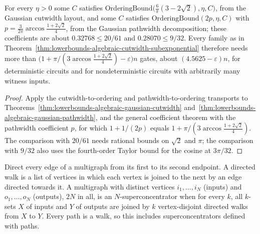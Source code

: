 \begin{theorem}
  \label{thm:lowerbounds-algebraic-gaussian-coefficient}
  \leanok
  For every $\eta>0$ some $C$ satisfies
  $\mathrm{OrderingBound}\bigl(\tfrac{6}{\pi}(3-2\sqrt2),\eta,C\bigr)$, from the
  Gaussian cutwidth layout, and some $C$ satisfies
  $\mathrm{OrderingBound}(2p,\eta,C)$ with
  $p=\tfrac{3}{2\pi}\arccos\tfrac{1+2\sqrt2}{4}$, from the Gaussian pathwidth
  decomposition; these coefficients are about $0.32768\le20/61$ and
  $0.28070\le9/32$. Every family as in
  Theorem~\ref{thm:lowerbounds-algebraic-cutwidth-subexponential} therefore
  needs more than $\bigl(1+\pi/(3\arccos\tfrac{1+2\sqrt2}{4})-\varepsilon\bigr)n$ gates,
  about $(4.5625-\varepsilon)n$, for deterministic circuits and for
  nondeterministic circuits with arbitrarily many witness inputs.
\end{theorem}
\begin{proof}
  \leanok
  Apply the cutwidth-to-ordering and pathwidth-to-ordering transports to
  Theorems~\ref{thm:lowerbounds-algebraic-gaussian-cutwidth}
  and~\ref{thm:lowerbounds-algebraic-gaussian-pathwidth}, and the general
  coefficient theorem with the pathwidth coefficient $p$, for which $1+1/(2p)$ equals
  $1+\pi/(3\arccos\tfrac{1+2\sqrt2}{4})$. The comparison with $20/61$ needs rational
  bounds on $\sqrt2$ and $\pi$; the comparison with $9/32$ also uses the fourth-order
  Taylor bound for the cosine at $3\pi/32$.
\end{proof}

\begin{definition}[Superconcentrator]
  \label{def:lowerbounds-algebraic-superconcentrator}
  \leanok
  Direct every edge of a multigraph from its first to its second endpoint. A directed walk
  is a list of vertices in which each vertex is joined to the next by an edge directed towards
  it. A multigraph with distinct vertices $i_1,\dots,i_N$ (inputs) and $o_1,\dots,o_N$
  (outputs), $2N$ in all, is an $N$-superconcentrator when for every $k$, all $k$-sets $X$ of
  inputs and $Y$ of outputs are joined by $k$ vertex-disjoint directed walks from $X$ to $Y$.
  Every path is a walk, so this includes superconcentrators defined with paths.
\end{definition}

